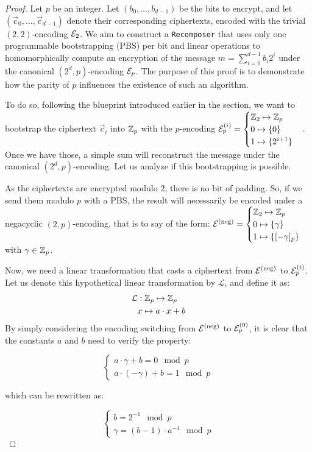 \begin{proof}
Let $p$ be an integer. Let $(b_0, \dots, b_{d-1})$ be the bits to encrypt, and let $(\vec c_0, \dots, \vec c_{d - 1})$ denote their corresponding ciphertexts, encoded with the trivial $(2, 2)$-encoding $\mathcal{E}_2$. We aim to construct a \texttt{Recomposer} that uses only one programmable bootstrapping (PBS) per bit and linear operations to homomorphically compute an encryption of the message $m = \sum_{i=0}^{d-1} b_i 2^i$ under the canonical $(2^d, p)$-encoding $\mathcal{E}_p$. The purpose of this proof is to demonstrate how the parity of $p$ influences the existence of such an algorithm.

To do so, following the blueprint introduced earlier in the section, we want to bootstrap the ciphertext $\vec c_i$ into $\mathbb{Z}_p$ with the $p$-encoding $\mathcal{E}_p^{(i)} = \begin{cases} \mathbb{Z}_2 \mapsto \mathbb{Z}_{p} \\ 0 \mapsto \{0\} \\ 1 \mapsto \{2^{i+1}\} \end{cases}$. Once we have those, a simple sum will reconstruct the message under the canonical $(2^d, p)$-encoding. Let us analyze if this bootstrapping is possible.

As the ciphertexts are encrypted modulo $2$, there is no bit of padding. So, if we send them modulo $p$ with a PBS, the result will necessarily be encoded under a negacyclic $(2, p)$-encoding, that is to say of the form: $\mathcal{E}^{\text{(neg)}} = \begin{cases} \mathbb{Z}_2 \mapsto \mathbb{Z}_{p} \\ 0 \mapsto \{\gamma\} \\ 1 \mapsto \{[-\gamma]_p\} \end{cases}$ with $\gamma \in \mathbb{Z}_p$.

Now, we need a linear transformation that casts a ciphertext from $\mathcal{E}^{\text{(neg)}}$ to $\mathcal{E}_p^{(i)}$. Let us denote this hypothetical linear transformation by $\mathcal{L}$, and define it as: \begin{align*}
    \mathcal{L} &: \mathbb{Z}_p \mapsto \mathbb{Z}_p\\
    & x \mapsto a \cdot x + b
\end{align*} 
By simply considering the encoding switching from $\mathcal{E}^{\text{(neg)}}$ to $\mathcal{E}_p^{(0)}$, it is clear that the constants $a$ and $b$ need to verify the property:

\[
    \begin{cases}
        a \cdot \gamma + b = 0 \mod p\\
        a \cdot (- \gamma) + b = 1 \mod p 
    \end{cases}
\]

which can be rewritten as:

\[
    \begin{cases}
        b = 2^{-1} \mod p\\
        \gamma = (b - 1) \cdot a^{-1} \mod p
    \end{cases}
\]



\end{proof}
